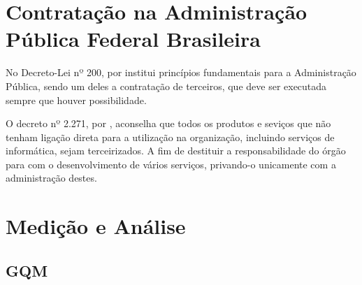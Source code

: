 \section{Contratação na Administração Pública Federal Brasileira}

No Decreto-Lei nº 200, \cite{decreto200} por institui princípios fundamentais para a
Administração Pública, sendo um deles a contratação de terceiros, que deve ser
executada sempre que houver possibilidade.

O decreto nº 2.271, por \cite{decreto2271}, aconselha que todos os produtos e seviços
que não tenham ligação direta para a utilização na organização, incluindo serviços
de informática, sejam terceirizados. A fim de destituir a responsabilidade do
órgão para com o desenvolvimento de vários serviços, privando-o unicamente com
a administração destes.

\section{Medição e Análise}
\subsection{GQM}
